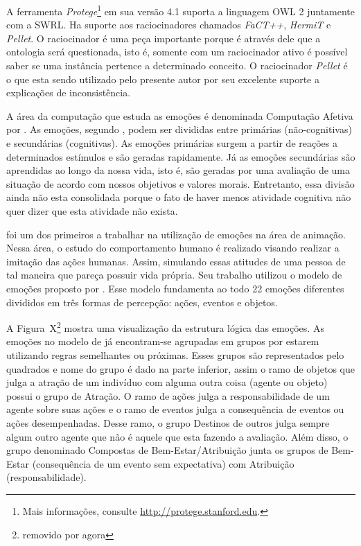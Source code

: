 A ferramenta \emph{Protege}\footnote{Mais informações, consulte \url{http://protege.stanford.edu}.}
em sua versão 4.1 suporta a linguagem OWL 2 juntamente com a SWRL. Ha suporte
aos raciocinadores chamados \emph{FaCT++}, \emph{HermiT} e \emph{Pellet}.
O raciocinador é uma peça importante porque é através dele que a ontologia
será questionada, isto é, somente com um raciocinador ativo é possível saber
se uma instância pertence a determinado conceito. O raciocinador
\emph{Pellet}\dev{} é o que esta sendo utilizado pelo presente autor por
seu excelente suporte a explicações de inconsistência.

A área da computação que estuda as emoções é denominada Computação Afetiva por
\citet{Pic98}. As emoções, segundo \citet{damasio2004erro}, podem ser divididas
entre primárias (não-cognitivas) e secundárias (cognitivas). As emoções
primárias surgem a partir de reações a determinados estímulos e são geradas
rapidamente. Já as emoções secundárias são aprendidas ao longo da nossa vida,
isto é, são geradas por uma avaliação de uma situação de acordo com nossos
objetivos e valores morais. Entretanto, essa divisão ainda não esta
consolidada porque o fato de haver menos atividade cognitiva não quer dizer
que esta atividade não exista.

\citet{bates1994role} foi um dos primeiros a trabalhar na utilização de
emoções na área de animação. Nessa área, o estudo do comportamento humano é
realizado visando realizar a imitação das ações humanas. Assim, simulando
essas atitudes de uma pessoa de tal maneira que pareça possuir vida própria.
Seu trabalho utilizou o modelo de emoções proposto por \citet{ortony1988cse}.
Esse modelo fundamenta ao todo 22 emoções diferentes divididos em três
formas de percepção: ações, eventos e objetos.


A Figura~X\footnote{removido por agora} mostra uma visualização da estrutura
lógica das emoções. As emoções no modelo de \citet{ortony1988cse} já
encontram-se agrupadas em grupos por estarem utilizando regras semelhantes ou
próximas. Esses grupos são representados pelo quadrados e nome do grupo é dado
na parte inferior, assim o ramo de objetos que julga a atração de um indivíduo
com alguma outra coisa (agente ou objeto) possui o grupo de Atração. O ramo de
ações julga a responsabilidade de um agente sobre suas ações e o ramo de
eventos julga a consequência de eventos ou ações desempenhadas. Desse ramo,
o grupo Destinos de outros julga sempre algum outro agente que não é aquele
que esta fazendo a avaliação. Além disso, o grupo denominado Compostas de
Bem-Estar/Atribuição junta os grupos de Bem-Estar (consequência de um evento
sem expectativa) com Atribuição (responsabilidade).

